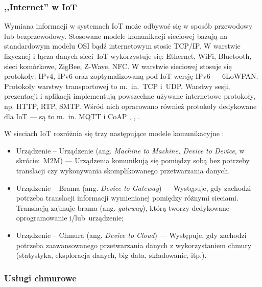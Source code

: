 \documentclass[a4paper, 12pt, twoside]{article}
\begin{document}
\subsubsection{,,Internet'' w IoT}

Wymiana informacji w systemach IoT może odbywać się w sposób przewodowy lub bezprzewodowy.
Stosowane modele komunikacji sieciowej bazują na standardowym modelu OSI bądź
internetowym stosie TCP/IP. W warstwie fizycznej i łącza danych
sieci~IoT wykorzystuje się: Ethernet, WiFi, Bluetooth, sieci komórkowe,
ZigBee, Z-Wave, NFC. W warstwie sieciowej stosuje się protokoły: IPv4, IPv6 oraz zoptymalizowaną
pod IoT wersję IPv6 --- 6LoWPAN. Protokoły warstwy transportowej to m.~in.~TCP i~UDP.
Warstwy sesji, prezentacji i aplikacji implementują powszechne używane internetowe protokoły, np.
HTTP, RTP, SMTP. Wśród nich opracowano również
protokoły dedykowane dla IoT --- są to m.~in. MQTT i CoAP \cite{internet-reczy}, \cite{intro-to-iot}, \cite{iot-hype-to-reality}.


W sieciach IoT rozróżnia się trzy następujące modele komunikacyjne \cite{intro-to-iot}:

\begin{itemize}
      \itemsep0em
      \item Urządzenie -- Urządzenie (ang. \emph{Machine to Machine, Device to Device}, w skrócie:~M2M)
            --- Urządzenia komunikują się pomiędzy sobą bez potrzeby translacji czy wykonywania
            skomplikowanego przetwarzania danych.
      \item Urządzenie -- Brama (ang. \emph{Device to Gateway})
            --- Występuje, gdy zachodzi potrzeba translacji informacji wymienianej pomiędzy różnymi sieciami.
            Translacją zajmuje brama (ang. \emph{gateway}), którą tworzy dedykowane oprogramowanie i/lub~urządzenie;
      \item Urządzenie -- Chmura (ang. \emph{Device to Cloud})
            --- Występuje, gdy zachodzi potrzeba zaawansowanego przetwarzania danych
            z wykorzystaniem chmury (statystyka, eksploracja danych, big data, składowanie, itp.).
\end{itemize}

\subsubsection{Usługi chmurowe}
\end{document}
